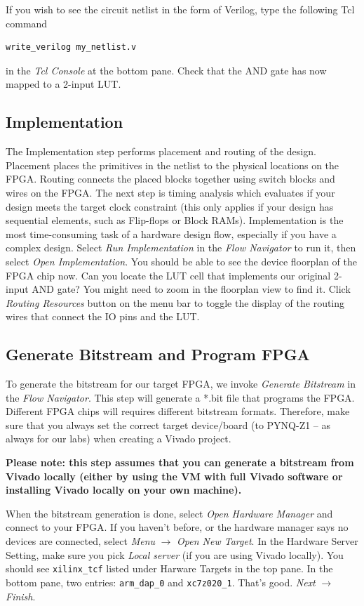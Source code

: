 \documentclass[11pt]{article}
\begin{document}
If you wish to see the circuit netlist in the form of Verilog, type the following Tcl command

\begin{verbatim}
write_verilog my_netlist.v
\end{verbatim}

in the \emph{Tcl Console} at the bottom pane. Check that the AND gate has now mapped to a 2-input LUT.

\subsection{Implementation}
The Implementation step performs placement and routing of the design. Placement places the primitives in the netlist to the physical locations on the FPGA. Routing connects the placed blocks together using switch blocks and wires on the FPGA. The next step is timing analysis which evaluates if your design meets the target clock constraint (this only applies if your design has sequential elements, such as Flip-flops or Block RAMs). Implementation is the most time-consuming task of a hardware design flow, especially if you have a complex design. Select \emph{Run Implementation} in the \emph{Flow Navigator} to run it, then select \emph{Open Implementation}. You should be able to see the device floorplan of the FPGA chip now. Can you locate the LUT cell that implements our original 2-input AND gate? You might need to zoom in the floorplan view to find it. Click \emph{Routing Resources} button on the menu bar to toggle the display of the routing wires that connect the IO pins and the LUT.

\subsection{Generate Bitstream and Program FPGA}
To generate the bitstream for our target FPGA, we invoke \emph{Generate Bitstream} in the \emph{Flow Navigator}. This step will generate a *.bit file that programs the FPGA. Different FPGA chips will requires different bitstream formats. Therefore, make sure that you always set the correct target device/board (to PYNQ-Z1 -- as always for our labs) when creating a Vivado project.

\textbf{Please note: this step assumes that you can generate a bitstream from Vivado locally (either by using the VM with full Vivado software or installing Vivado locally on your own machine).}

When the bitstream generation is done, select \emph{Open Hardware Manager} and connect to your FPGA. If you haven't before, or the hardware manager says no devices are connected, select \emph{Menu} $\rightarrow$ \emph{Open New Target}. In the Hardware Server Setting, make sure you pick \emph{Local server} (if you are using Vivado locally). You should see \verb|xilinx_tcf| listed under Harware Targets in the top pane. In the bottom pane, two entries: \verb|arm_dap_0| and \verb|xc7z020_1|. That's good. \emph{Next} $\rightarrow$ \emph{Finish}.
\end{document}
